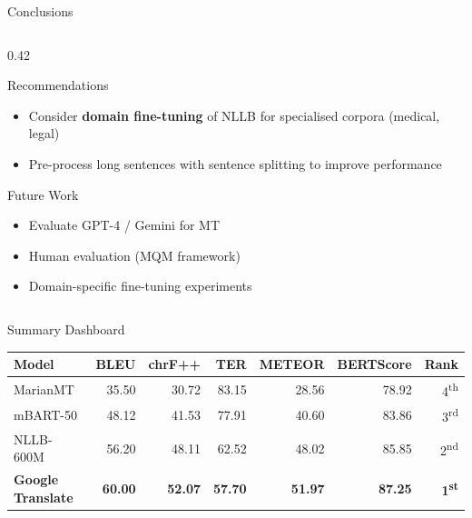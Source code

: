 \documentclass[aspectratio=169]{beamer}
\newcommand{\rowGold}{\rowcolor{mtgold!20}}
\begin{document}
\begin{frame}{Conclusions}
\begin{columns}[T]
\begin{column}{0.42\textwidth}
\begin{alertblock}{Recommendations}
\begin{itemize}
          \item Consider \textbf{domain fine-tuning} of NLLB for specialised corpora (medical, legal)
          \item Pre-process long sentences with sentence splitting to improve performance
        \end{itemize}
      \end{alertblock}
      \vspace{0.3cm}
      \begin{block}{Future Work}
        \begin{itemize}
          \item Evaluate GPT-4 / Gemini for MT
          \item Human evaluation (MQM framework)
          \item Domain-specific fine-tuning experiments
        \end{itemize}
      \end{block}
    \end{column}
  \end{columns}
\end{frame}

\begin{frame}{Summary Dashboard}
  \centering
  \renewcommand{\arraystretch}{1.6}
  \begin{tabular}{lrrrrrr}
    \toprule
    \textbf{Model} & \textbf{BLEU} & \textbf{chrF++} & \textbf{TER} & \textbf{METEOR} & \textbf{BERTScore} & \textbf{Rank} \\
    \midrule
    MarianMT      & 35.50 & 30.72 & 83.15 & 28.56 & 78.92 & \textcolor{mtred}{4\textsuperscript{th}} \\
    mBART-50      & 48.12 & 41.53 & 77.91 & 40.60 & 83.86 & \textcolor{mtblue}{3\textsuperscript{rd}} \\
    NLLB-600M     & 56.20 & 48.11 & 62.52 & 48.02 & 85.85 & \textcolor{mtaccent}{2\textsuperscript{nd}} \\
    \rowGold
    \textbf{Google Translate} & \textbf{60.00} & \textbf{52.07} & \textbf{57.70} & \textbf{51.97} & \textbf{87.25} & \textcolor{mtgreen}{\textbf{1\textsuperscript{st}}} \\
    \bottomrule
  \end{tabular}
  \vspace{0.6cm}
\end{frame}
\end{document}
